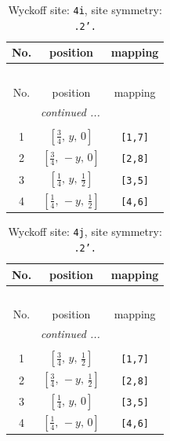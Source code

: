 \documentclass[fleqn,8pt]{jsarticle}
\begin{document}
\renewcommand{\arraystretch}{1.2}
\begin{longtable}{ccc}
\caption{Wyckoff site: {\tt 4i}, site symmetry: {\tt .2'.}}
 \\
 \hline \hline
No. & position & mapping \\ \hline \endfirsthead

\multicolumn{2}{l}{\tablename\ \thetable{}} \\
 \hline \hline
No. & position & mapping \\ \hline \endhead

 \hline \hline
\multicolumn{2}{r}{\footnotesize\it continued ...} \\ \endfoot

 \hline \hline
\multicolumn{2}{r}{} \\ \endlastfoot

1 & $\left[ \frac{3}{4},\, y,\, 0 \right]$ & {\tt [1,7]} \\ \hline
2 & $\left[ \frac{3}{4},\, - y,\, 0 \right]$ & {\tt [2,8]} \\ \hline
3 & $\left[ \frac{1}{4},\, y,\, \frac{1}{2} \right]$ & {\tt [3,5]} \\ \hline
4 & $\left[ \frac{1}{4},\, - y,\, \frac{1}{2} \right]$ & {\tt [4,6]} \\
\end{longtable}
\renewcommand{\arraystretch}{1.2}
\begin{longtable}{ccc}
\caption{Wyckoff site: {\tt 4j}, site symmetry: {\tt .2'.}}
 \\
 \hline \hline
No. & position & mapping \\ \hline \endfirsthead

\multicolumn{2}{l}{\tablename\ \thetable{}} \\
 \hline \hline
No. & position & mapping \\ \hline \endhead

 \hline \hline
\multicolumn{2}{r}{\footnotesize\it continued ...} \\ \endfoot

 \hline \hline
\multicolumn{2}{r}{} \\ \endlastfoot

1 & $\left[ \frac{3}{4},\, y,\, \frac{1}{2} \right]$ & {\tt [1,7]} \\ \hline
2 & $\left[ \frac{3}{4},\, - y,\, \frac{1}{2} \right]$ & {\tt [2,8]} \\ \hline
3 & $\left[ \frac{1}{4},\, y,\, 0 \right]$ & {\tt [3,5]} \\ \hline
4 & $\left[ \frac{1}{4},\, - y,\, 0 \right]$ & {\tt [4,6]} \\
\end{longtable}
\end{document}
